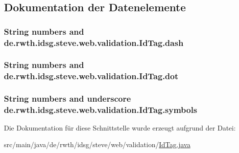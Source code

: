 \subsection{Dokumentation der Datenelemente}
\hypertarget{interfacede_1_1rwth_1_1idsg_1_1steve_1_1web_1_1validation_1_1_id_tag_aa0d09b323e37c7ef9c04d2ed5f337e8d}{
\subsubsection[{dash}]{\setlength{\rightskip}{0pt plus 5cm}String numbers and de.\-rwth.\-idsg.\-steve.\-web.\-validation.\-Id\-Tag.\-dash}}\label{interfacede_1_1rwth_1_1idsg_1_1steve_1_1web_1_1validation_1_1_id_tag_aa0d09b323e37c7ef9c04d2ed5f337e8d}
\hypertarget{interfacede_1_1rwth_1_1idsg_1_1steve_1_1web_1_1validation_1_1_id_tag_a39834f0933c670923b9547c9606aa61b}{
\subsubsection[{dot}]{\setlength{\rightskip}{0pt plus 5cm}String numbers and de.\-rwth.\-idsg.\-steve.\-web.\-validation.\-Id\-Tag.\-dot}}\label{interfacede_1_1rwth_1_1idsg_1_1steve_1_1web_1_1validation_1_1_id_tag_a39834f0933c670923b9547c9606aa61b}
\hypertarget{interfacede_1_1rwth_1_1idsg_1_1steve_1_1web_1_1validation_1_1_id_tag_a19a9f8538560b959db4b406c1576862e}{
\subsubsection[{symbols}]{\setlength{\rightskip}{0pt plus 5cm}String numbers and underscore de.\-rwth.\-idsg.\-steve.\-web.\-validation.\-Id\-Tag.\-symbols}}\label{interfacede_1_1rwth_1_1idsg_1_1steve_1_1web_1_1validation_1_1_id_tag_a19a9f8538560b959db4b406c1576862e}


Die Dokumentation für diese Schnittstelle wurde erzeugt aufgrund der Datei\-:\begin{DoxyCompactItemize}
\item 
src/main/java/de/rwth/idsg/steve/web/validation/\hyperlink{_id_tag_8java}{Id\-Tag.\-java}\end{DoxyCompactItemize}
